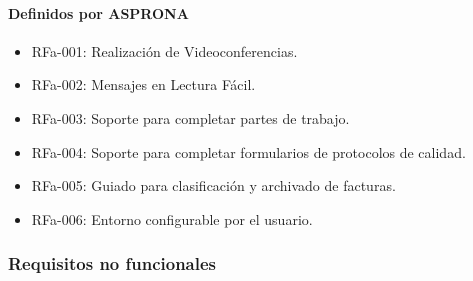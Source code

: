 \paragraph{Definidos por ASPRONA}
\begin{itemize}
\item RFa-001: Realización de Videoconferencias.
\item RFa-002: Mensajes en Lectura Fácil.
\item RFa-003: Soporte para completar partes de trabajo.
\item RFa-004: Soporte para completar formularios de protocolos de calidad.
\item RFa-005: Guiado para clasificación y archivado de facturas.
\item RFa-006: Entorno configurable por el usuario.
\end{itemize}
\subsubsection{Requisitos no funcionales}

